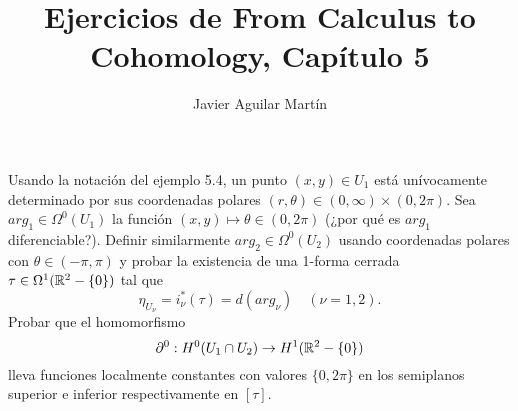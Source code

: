 \documentclass[twoside]{article}
\begin{document}
\title{Ejercicios de From Calculus to Cohomology, Capítulo 5}
\author{Javier Aguilar Martín}
\maketitle


\begin{ejercicio}{5.1}
Usando la notación del ejemplo 5.4, un punto $(x,y)\in U_1$ está unívocamente determinado por sus coordenadas polares $(r,\theta)\in (0,\infty)\times (0,2\pi)$. Sea $arg_1\in\Omega^0(U_1)$ la función $(x,y)\mapsto \theta\in(0,2\pi)$ (¿por qué es $arg_1$ diferenciable?). Definir similarmente $arg_2\in\Omega^0(U_2)$ usando coordenadas polares con $\theta\in (-\pi,\pi)$ y probar la existencia de una 1-forma cerrada $\tau\in\Omega^1(\mathbb{R}^2-\{0\})$ tal que
\[
\eta_{U_{\nu}}=i^*_{\nu}(\tau)=d(arg_{\nu})\quad (\nu=1,2).
\]
Probar que el homomorfismo 
\[
\partial^0:H^0(U_1\cap U_2)\to H^1(\mathbb{R}^2-\{0\})
\]
lleva funciones localmente constantes con valores $\{0,2\pi\}$ en los semiplanos superior e inferior respectivamente en $[\tau]$. 
\end{ejercicio}
\end{document}
